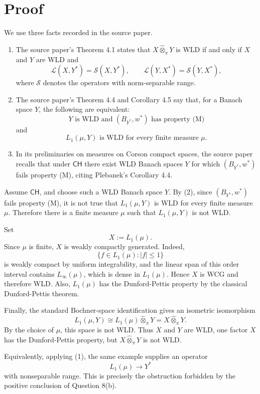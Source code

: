 \documentclass[11pt]{article}
\newcommand{\otpi}{\widehat{\otimes}_{\pi}}
\newcommand{\weakstar}{w^*}
\newcommand{\CH}{\mathsf{CH}}
\newcommand{\Srange}{\mathcal{S}}
\newcommand{\Lop}{\mathcal{L}}
\begin{document}
\section*{Proof}

We use three facts recorded in the source paper.

\begin{enumerate}[label=(\arabic*)]
\item The source paper's Theorem 4.1 states that \(X\otpi Y\) is WLD if and
only if \(X\) and \(Y\) are WLD and
\[
\Lop(X,Y^*)=\Srange(X,Y^*), \qquad
\Lop(Y,X^*)=\Srange(Y,X^*),
\]
where \(\Srange\) denotes the operators with norm-separable range.

\item The source paper's Theorem 4.4 and Corollary 4.5 say that, for a Banach
space \(Y\), the following are equivalent:
\[
Y\text{ is WLD and }(B_{Y^*},\weakstar)\text{ has property (M)}
\]
and
\[
L_1(\mu,Y)\text{ is WLD for every finite measure }\mu.
\]

\item In its preliminaries on measures on Corson compact spaces, the source
paper recalls that under \(\CH\) there exist WLD Banach spaces \(Y\) for which
\((B_{Y^*},\weakstar)\) fails property (M), citing Plebanek's Corollary 4.4.
\end{enumerate}

Assume \(\CH\), and choose such a WLD Banach space \(Y\).  By (2), since
\((B_{Y^*},\weakstar)\) fails property (M), it is not true that
\(L_1(\mu,Y)\) is WLD for every finite measure \(\mu\).  Therefore there is a
finite measure \(\mu\) such that \(L_1(\mu,Y)\) is not WLD.

Set
\[
X:=L_1(\mu).
\]
Since \(\mu\) is finite, \(X\) is weakly compactly generated.  Indeed,
\[
\{f\in L_1(\mu): |f|\le 1\}
\]
is weakly compact by uniform integrability, and the linear span of this order
interval contains \(L_\infty(\mu)\), which is dense in \(L_1(\mu)\).  Hence
\(X\) is WCG and therefore WLD.  Also, \(L_1(\mu)\) has the Dunford-Pettis
property by the classical Dunford-Pettis theorem.

Finally, the standard Bochner-space identification gives an isometric
isomorphism
\[
L_1(\mu,Y)\cong L_1(\mu)\otpi Y=X\otpi Y.
\]
By the choice of \(\mu\), this space is not WLD.  Thus \(X\) and \(Y\) are WLD,
one factor \(X\) has the Dunford-Pettis property, but \(X\otpi Y\) is not WLD.

Equivalently, applying (1), the same example supplies an operator
\[
L_1(\mu)\to Y^*
\]
with nonseparable range.  This is precisely the obstruction forbidden by the
positive conclusion of Question 8(b).
\end{document}
